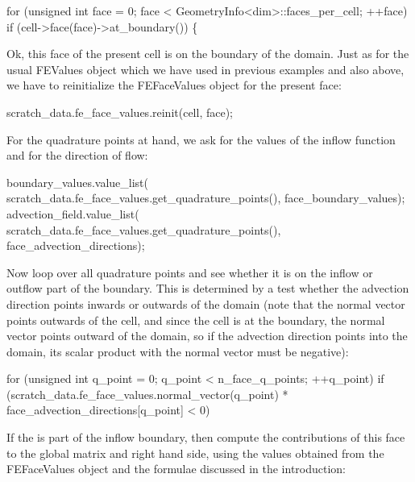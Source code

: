 \begin{DoxyCode}
\textcolor{keywordflow}{for} (\textcolor{keywordtype}{unsigned} \textcolor{keywordtype}{int} face = 0; face < GeometryInfo<dim>::faces\_per\_cell;
     ++face)
    \textcolor{keywordflow}{if} (cell->face(face)->at\_boundary()) \{
\end{DoxyCode}


Ok, this face of the present cell is on the boundary of the domain. Just as for the usual F\+E\+Values object which we have used in previous examples and also above, we have to reinitialize the F\+E\+Face\+Values object for the present face\+:


\begin{DoxyCode}
scratch\_data.fe\_face\_values.reinit(cell, face);
\end{DoxyCode}


For the quadrature points at hand, we ask for the values of the inflow function and for the direction of flow\+:


\begin{DoxyCode}
boundary\_values.value\_list(
    scratch\_data.fe\_face\_values.get\_quadrature\_points(),
    face\_boundary\_values);
advection\_field.value\_list(
    scratch\_data.fe\_face\_values.get\_quadrature\_points(),
    face\_advection\_directions);
\end{DoxyCode}


Now loop over all quadrature points and see whether it is on the inflow or outflow part of the boundary. This is determined by a test whether the advection direction points inwards or outwards of the domain (note that the normal vector points outwards of the cell, and since the cell is at the boundary, the normal vector points outward of the domain, so if the advection direction points into the domain, its scalar product with the normal vector must be negative)\+:


\begin{DoxyCode}
\textcolor{keywordflow}{for} (\textcolor{keywordtype}{unsigned} \textcolor{keywordtype}{int} q\_point = 0; q\_point < n\_face\_q\_points; ++q\_point)
    \textcolor{keywordflow}{if} (scratch\_data.fe\_face\_values.normal\_vector(q\_point) *
            face\_advection\_directions[q\_point] <
        0)
\end{DoxyCode}


If the is part of the inflow boundary, then compute the contributions of this face to the global matrix and right hand side, using the values obtained from the F\+E\+Face\+Values object and the formulae discussed in the introduction\+:


